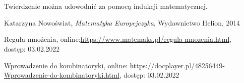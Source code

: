 \documentclass[polish,10pt]{article}
\begin{document}
\hspace{1cm}\\\noindent{}

\hspace{1cm}\\Twierdzenie można udowodnić za pomocą indukcji matematycznej.


\begin{thebibliography}{4}
    Katarzyna Nowoświat, \emph{Matematyka Europejczyka}, Wydawnictwo Helion, 2014

Reguła mnożenia, online:\url{https://www.matemaks.pl/regula-mnozenia.html}, dostęp: 03.02.2022

Wprowadzenie do kombinatoryki, online: \url{https://docplayer.pl/48256449-Wprowadzenie-do-kombinatoryki.html}, dostęp: 03.02.2022

\end{thebibliography}
\end{document}
